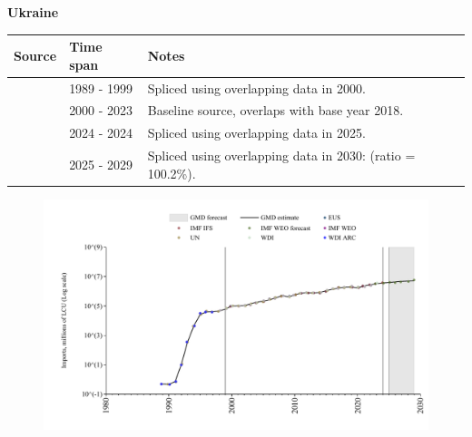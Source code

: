 \documentclass[12pt,a4paper,landscape]{article}
\begin{document}
\begin{adjustbox}{max totalsize={\paperwidth}{\paperheight},center}
\begin{minipage}[t][\textheight][t]{\textwidth}
\vspace*{0.5cm}
{}
\begin{center}
{\Large\bfseries Ukraine}
\end{center}
\vspace{0.5cm}
\begin{table}[H]
\centering
\small
\begin{tabular}{|l|l|l|}
\hline
\textbf{Source} & \textbf{Time span} & \textbf{Notes} \\
\hline
\rowcolor{white}\cite{WDI}& 1989 - 1999 &Spliced using overlapping data in 2000.\\
\rowcolor{lightgray}\cite{EUS}& 2000 - 2023 &Baseline source, overlaps with base year 2018.\\
\rowcolor{white}\cite{IMF_IFS}& 2024 - 2024 &Spliced using overlapping data in 2025.\\
\rowcolor{lightgray}\cite{IMF_WEO_forecast}& 2025 - 2029 &Spliced using overlapping data in 2030: (ratio = 100.2\%).\\
\hline
\end{tabular}
\end{table}
\begin{figure}[H]
\centering
\includegraphics[width=\textwidth,height=0.6\textheight,keepaspectratio]{graphs/UKR_imports.pdf}
\end{figure}
\end{minipage}
\end{adjustbox}
\end{document}
